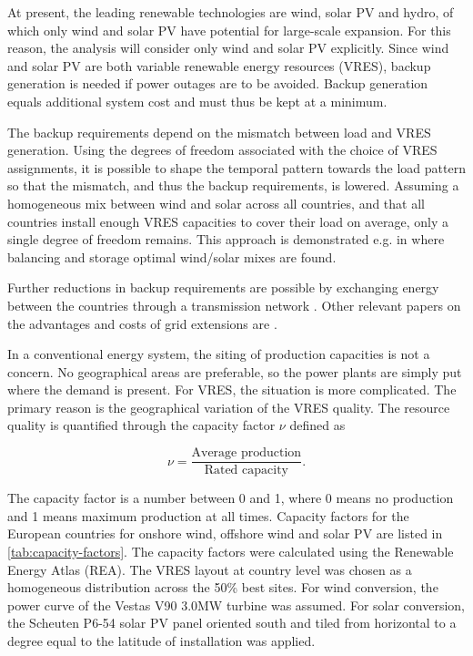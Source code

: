 \documentclass[a4paper, 5p, sort&compress]{elsarticle}%
\begin{document}
At present, the leading renewable technologies are wind, solar PV and
hydro, of which only wind and solar PV have potential for large-scale
expansion. For this reason, the analysis will consider only wind and
solar PV explicitly. Since wind and solar PV are both variable
renewable energy resources (VRES), backup generation is needed if
power outages are to be avoided. Backup generation equals additional
system cost and must thus be kept at a minimum.

The backup requirements depend on the mismatch between load and VRES
generation. Using the degrees of freedom associated with the choice of
VRES assignments, it is possible to shape the temporal pattern towards
the load pattern so that the mismatch, and thus the backup
requirements, is lowered. Assuming a homogeneous mix between wind and
solar across all countries, and that all countries install enough VRES
capacities to cover their load on average, only a single degree of
freedom remains. This approach is demonstrated e.g. in
\cite{Heide2010,Heide2011} where balancing and storage optimal
wind/solar mixes are found.

Further reductions in backup requirements are possible by exchanging
energy between the countries through a transmission network
\cite{rolando2014,sarah}. Other relevant papers on the advantages and
costs of grid extensions are \cite{Schaber, Schaber2}.


In a conventional energy system, the siting of production capacities
is not a concern. No geographical areas are preferable, so the power
plants are simply put where the demand is present. For VRES, the
situation is more complicated. The primary reason is the geographical
variation of the VRES
quality. %
The resource quality is quantified through the capacity factor $\nu$ defined as

\begin{equation}
  \label{eq:1}
  \nu = \frac{\mbox{Average production}}{\mbox{Rated capacity}} .
\end{equation}

The capacity factor is a number between 0 and 1, where 0 means no
production and 1 means maximum production at all times. Capacity
factors for the European countries for onshore wind, offshore wind and
solar PV are listed in \cref{tab:capacity-factors}. The capacity
factors were calculated using the Renewable Energy Atlas \cite{REA}
(REA). The VRES layout at country level was chosen as a homogeneous
distribution across the 50\% best sites. For wind conversion, the
power curve of the Vestas V90 3.0MW turbine was assumed. For solar
conversion, the Scheuten P6-54 solar PV panel oriented south and tiled
from horizontal to a degree equal to the latitude of installation was
applied.
\end{document}
